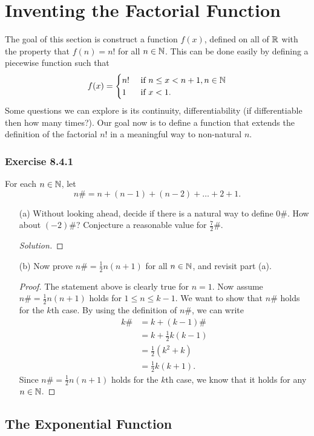 \section{Inventing the Factorial Function}
The goal of this section is construct a function \( f(x)  \), defined on all of \( \mathbb{R}  \) with the property that \( f(n) = n!  \) for all \( n \in \mathbb{N}  \). This can be done easily by defining a piecewise function such that  
\[ f(x) = 
\begin{cases}
    n! \ &\text{if } n \leq x < n+1, n \in \mathbb{N} \\ 
    1 \ &\text{if } x < 1.
\end{cases}  \] Some questions we can explore is its continuity, differentiability (if differentiable then how many times?). Our goal now is to define a function that extends the definition of the factorial \( n!  \) in a meaningful way to non-natural \(  n \). 
\subsubsection{Exercise 8.4.1} For each \( n \in \mathbb{N}  \), let 
\[  n \# = n + (n -1 ) + (n-2) + \dots + 2 + 1. \]
\begin{enumerate}
    \item[(a)] Without looking ahead, decide if there is a natural way to define \( 0 \#  \). How about \( (-2) \#  \)? Conjecture a reasonable value for \(  \frac{ 7 }{ 2 }  \# \).
        \begin{proof}[Solution]
        
        \end{proof}
    \item[(b)] Now prove \( n \# = \frac{ 1 }{ 2 }  n (n+1) \) for all \( n \in \mathbb{N}  \), and revisit part (a).
        \begin{proof}
        The statement above is clearly true for \( n =1  \). Now assume \(  n \#   = \frac{ 1 }{ 2 }  n (n+1) \) holds for \(  1 \leq n \leq k -1  \). We want to show that \( n \#  \) holds for the \( k  \)th case. By using the definition of \( n \#  \), we can write 
        \begin{align*}
            k \# &= k + (k-1)\#  \\
                 &= k + \frac{ 1 }{ 2 }  k (k-1) \\
                 &= \frac{ 1 }{ 2 }  (k^{2} + k) \\
                 &= \frac{ 1 }{ 2 } k (k+1).
        \end{align*}
        Since \( n \# = \frac{ 1 }{ 2 }  n (n+1)  \) holds for the \( k  \)th case, we know that it holds for any \( n \in \mathbb{N}  \).
        \end{proof}
\end{enumerate}

\subsection{The Exponential Function} 


